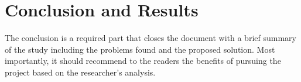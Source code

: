 \chapter{Conclusion and Results}

The conclusion is a required part that closes the document with a brief summary of the study including the problems found and the proposed solution. Most importantly, it should recommend to the readers the benefits of pursuing the project based on the researcher’s analysis.